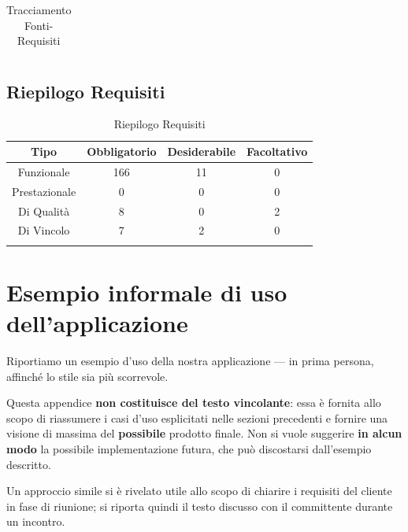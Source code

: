 \begin{itemize}
\begin{itemize}
\begin{itemize}
\begin{itemize}
\begin{longtable}{|>{\centering}m{5cm}|m{5cm}<{\centering}|}
\caption[Tracciamento Fonti-Requisiti]{Tracciamento Fonti-Requisiti}
\label{tabella:fonti-requi}
\end{longtable}
\clearpage

\subsection{Riepilogo Requisiti}
\normalsize
\begin{longtable}{|c|c|c|c|}
\hline
\textbf{Tipo} & \textbf{Obbligatorio} & \textbf{Desiderabile} & \textbf{Facoltativo}\\
\hline
Funzionale & 166 & 11 & 0\\ \hline
Prestazionale & 0 & 0 & 0\\ \hline
Di Qualità & 8 & 0 & 2\\ \hline
Di Vincolo & 7 & 2 & 0\\ \hline
\caption[Riepilogo Requisiti]{Riepilogo Requisiti}
\label{tabella:riepilogorequi}
\end{longtable}
\clearpage






\appendix
\section{Esempio informale di uso dell'applicazione }


Riportiamo un esempio d'uso della nostra applicazione --- in prima persona, affinché lo stile sia più scorrevole.

Questa appendice \textbf{non costituisce del testo vincolante}: essa è fornita allo scopo di riassumere i casi d'uso esplicitati nelle sezioni precedenti e fornire una visione di massima del \textbf{possibile} prodotto finale. Non si vuole suggerire \textbf{in alcun modo} la possibile implementazione futura, che può discostarsi dall'esempio descritto.

Un approccio simile si è rivelato utile allo scopo di chiarire i requisiti del cliente in fase di riunione; si riporta quindi il testo discusso con il committente durante un incontro.


\end{itemize}
\end{itemize}
\end{itemize}
\end{itemize}
